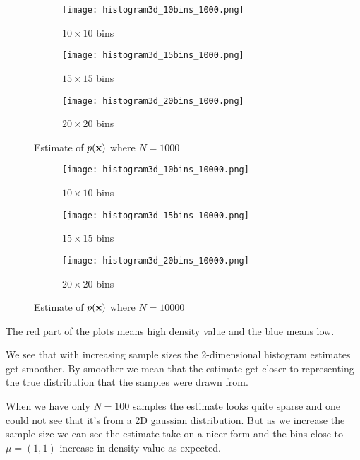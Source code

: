 \documentclass[a4paper,10pt]{article}
\begin{document}
\begin{figure}[H]
	\centering
	\begin{subfigure}{0.4\textwidth}
  		\centering
  		\texttt{[image: histogram3d\_10bins\_1000.png]}
  		\caption{$10 \times 10$ bins}
  \end{subfigure}
  \begin{subfigure}{0.4\textwidth}
  		\centering
  		\texttt{[image: histogram3d\_15bins\_1000.png]}
  		\caption{$15 \times 15$ bins}
  \end{subfigure}
  \begin{subfigure}{0.4\textwidth}
  		\centering
  		\texttt{[image: histogram3d\_20bins\_1000.png]}
  		\caption{$20 \times 20$ bins}
  \end{subfigure}
  	\caption{Estimate of $p(\bf{x})$ where $N = 1000$}
\end{figure}

\begin{figure}[H]
	\centering
	\begin{subfigure}{0.4\textwidth}
  		\centering
  		\texttt{[image: histogram3d\_10bins\_10000.png]}
  		\caption{$10 \times 10$ bins}
  \end{subfigure}
  \begin{subfigure}{0.4\textwidth}
  		\centering
  		\texttt{[image: histogram3d\_15bins\_10000.png]}
  		\caption{$15 \times 15$ bins}
  \end{subfigure}
  \begin{subfigure}{0.4\textwidth}
  		\centering
  		\texttt{[image: histogram3d\_20bins\_10000.png]}
  		\caption{$20 \times 20$ bins}
  \end{subfigure}
  	\caption{Estimate of $p(\bf{x})$ where $N = 10000$}
\end{figure}

The red part of the plots means high density value and the blue means low.

We see that with increasing sample sizes the 2-dimensional histogram estimates get smoother. By smoother we mean that the estimate get closer to representing the true distribution that the samples were drawn from. 

When we have only $N = 100$ samples the estimate looks quite sparse and one could not see that it's from a 2D gaussian distribution. But as we increase the sample size we can see the estimate take on a nicer form and the bins close to $\mu = (1,1)$ increase in density value as expected.
 
\end{document}
